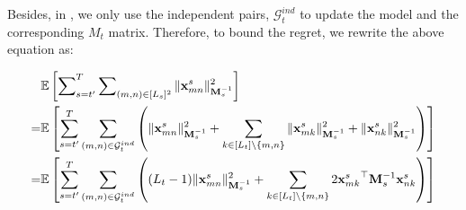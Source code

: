 Besides, in \model{}, we only use the independent pairs, $\mathcal{G}_t^{ind}$ to update the model and the corresponding $M_t$ matrix. Therefore, to bound the regret, we rewrite the above equation as:

\small
\begin{align*}
    &\mathbb{E}\left[\sum\nolimits_{s=t^\prime}^T\sum\nolimits_{(m, n) \in [L_s]^2} \Vert{\mathbf{x}_{mn}^s}\Vert_{\mathbf{M}_s^{-1}}^2\right]  \\
    =& \mathbb{E}\left[\sum_{s=t^\prime}^T\sum_{(m, n) \in \mathcal{G}_t^{ind}} \left (\Vert{\mathbf{x}_{mn}^s}\Vert_{\mathbf{M}_s^{-1}}^2 + \sum_{k\in [L_t] \setminus \{m, n\} } \Vert\mathbf{x}_{mk}^s\Vert_{\mathbf{M}_s^{-1}}^2 + \Vert\mathbf{x}_{nk}^s\Vert_{\mathbf{M}_s^{-1}}^2\right)\right] \\
    =& \mathbb{E}\left[\sum_{s=t^\prime}^T\sum_{(m, n) \in \mathcal{G}_t^{ind}} \left ((L_t - 1)\Vert{\mathbf{x}_{mn}^s}\Vert_{\mathbf{M}_s^{-1}}^2 + \sum_{k\in [L_t] \setminus \{m, n\} } 2{\mathbf{x}_{mk}^s}^\top\mathbf{M}_s^{-1}\mathbf{x}_{nk}^s\right)\right]
\end{align*}
\normalsize







